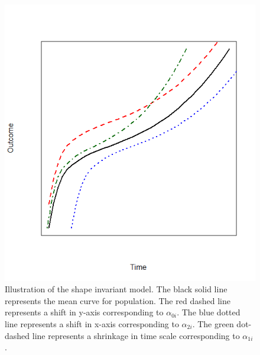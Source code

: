 \documentclass{article}
\numberwithin{equation}{section}
\begin{document}
 
\begin{figure}[h]
	\includegraphics[width=\linewidth]{rplot.png}
	\caption{Illustration of the shape invariant model. The black solid line represents the mean curve for population. The red dashed line represents a shift in y-axis corresponding to $\alpha_{0i}$. The blue dotted line represents a shift in x-axis corresponding to $\alpha_{2i}$. The green dot-dashed line represents a shrinkage in time scale corresponding to $\alpha_{1i}$. }
	\label{sim illu}
\end{figure}



 
	
\end{document}
